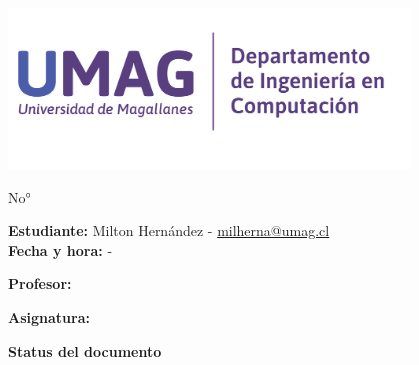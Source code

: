 \begin{titlepage}
    \centering
    \begin{center}
        \includegraphics[width=0.8\textwidth]{src/images/Depto_compu.png}
    \end{center}
    \vspace{0.01cm}
    {\LARGE\bfseries \doctitle \par}
    {\large\doctype No° \docnumber\par}
    \vspace{1.5cm}
    {\large \textbf{Estudiante:} Milton Hernández - \href{mailto:milherna@umag.cl}{milherna@umag.cl}}\\
    \vspace{0.3cm}
    \textbf{Fecha y hora:} {\docdate - \doctime} \\
    \vspace{0.3cm}
    {\large \textbf{Profesor:} \docprofessor \par}
    \vspace{0.3cm}
    {\large \textbf{Asignatura:} \docsubject \par}
    \vspace{1.5cm}
    {\LARGE\bfseries Status del documento \par}
    
    \vfill
\end{titlepage}